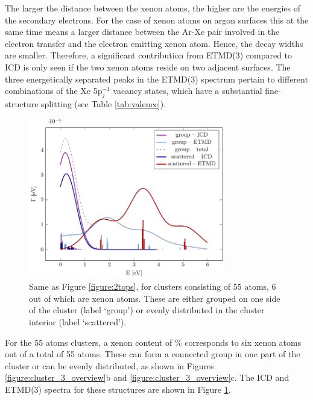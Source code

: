 The larger the distance between the xenon atoms, the higher are the energies
of the secondary electrons. For the case of xenon atoms on argon surfaces
this at the same time means a larger distance between the Ar-Xe pair involved in
the electron transfer and the electron emitting xenon atom. Hence, the
decay widths are smaller. 
Therefore, a
significant contribution from ETMD(3) compared to ICD is only
seen if the two xenon atoms reside on two adjacent
surfaces. 
The three energetically separated peaks in the ETMD(3) spectrum pertain to different combinations of the Xe 5p$_j^{-1}$ vacancy states, which have a substantial fine-structure splitting (see Table \ref{tab:valence}). 
%

\begin{figure}[ht]
 \centering
 \includegraphics[width=8.5cm]{pics/ar_3_6in.pdf}
 \caption{Same as Figure \protect\ref{figure:2tops}, for clusters consisting of
          55 atoms, 6 out of which are xenon atoms. These are either grouped
          on one side of the cluster (label `group') or evenly distributed
          in the cluster interior (label `scattered').}
 \label{figure:ar_3_6in}
\end{figure}
%
For the 55 atoms clusters, a xenon content of \unit[10--12]{\%}
corresponds to six xenon atoms out of a total of 55 atoms. These can form a connected 
group in one part of the cluster or can be evenly distributed,
as shown in Figures \ref{figure:cluster_3_overview}b and \ref{figure:cluster_3_overview}c. The
ICD and ETMD(3) spectra for these structures are shown in Figure \ref{figure:ar_3_6in}.

